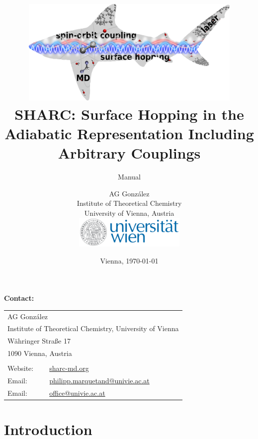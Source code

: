 \documentclass[a4paper,11pt,DIV=15,openany,twoside=false]{scrbook}
\title{\hspace{1cm}\includegraphics[width=0.8\textwidth,keepaspectratio=true]{img/sharc.png}\vspace{1.5cm}\\
    SHARC: Surface Hopping in the Adiabatic Representation Including Arbitrary Couplings}
\subtitle{Manual}
\date{Vienna, \today}
\author{AG Gonz\'alez\\
Institute of Theoretical Chemistry\\
University of Vienna, Austria
\vspace{1cm}
\\
\includegraphics[width=0.4\textwidth,keepaspectratio=true]{img/univie.pdf}}
\newenvironment{example}{
  \vspace{0mm}
  \definecolor{shadecolor}{HTML}{BBDDFF}
  \begin{shaded}
  \begin{minipage}{0.9\textwidth}
}{
  \end{minipage}
  \end{shaded}
}
\begin{document}
\tpage


\begin{example}
  \textbf{Contact:}

  \begin{tabular}{ll}
    \\
    \multicolumn{2}{l}{AG Gonz\'alez}\\
    \multicolumn{2}{l}{Institute of Theoretical Chemistry, University of Vienna}\\
    \multicolumn{2}{l}{W\"ahringer Stra\ss{}e 17}\\
    \multicolumn{2}{l}{1090 Vienna, Austria}\\
    \\
    Website: &\href{http://sharc-md.org}{sharc-md.org}\\
    Email: &\href{mailto:philipp.marquetand@univie.ac.at}{philipp.marquetand@univie.ac.at}\\
    Email: &\href{mailto:office@univie.ac.at}{office@univie.ac.at}\\
  \end{tabular}
\end{example}

\newpage
{}
\ohead{\rightmark}
\ofoot[\pagemark]{\pagemark}


\tableofcontents


\chapter{Introduction}
\end{document}
